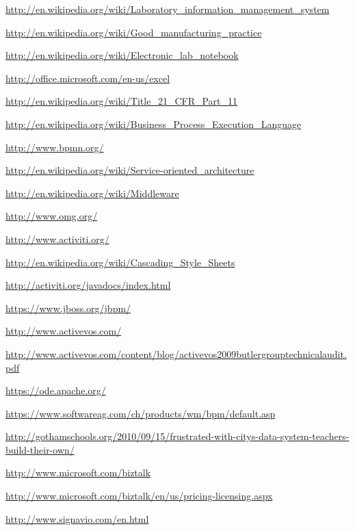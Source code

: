 \documentclass[paper=a4,twoside=false,BCOR=0mm,DIV=calc,fontsize=12pt]{scrartcl}
\begin{document}
\begin{thebibliography}{99}

 \url{http://en.wikipedia.org/wiki/Laboratory_information_management_system}

 \url{}

 \url{http://en.wikipedia.org/wiki/Good_manufacturing_practice}

 \url{http://en.wikipedia.org/wiki/Electronic_lab_notebook}

 \url{http://office.microsoft.com/en-us/excel}

 \url{http://en.wikipedia.org/wiki/Title_21_CFR_Part_11}

 \url{http://en.wikipedia.org/wiki/Business_Process_Execution_Language}

 \url{http://www.bpmn.org/}

 \url{http://en.wikipedia.org/wiki/Service-oriented_architecture}

 \url{http://en.wikipedia.org/wiki/Middleware}

 \url{http://www.omg.org/}

 \url{http://www.activiti.org/}

 \url{http://en.wikipedia.org/wiki/Cascading_Style_Sheets}

 \url{http://activiti.org/javadocs/index.html}

 \url{https://www.jboss.org/jbpm/}

 \url{http://www.activevos.com/}

 \url{http://www.activevos.com/content/blog/activevos2009butlergrouptechnicalaudit.pdf}

 \url{https://ode.apache.org/}

 \url{https://www.softwareag.com/ch/products/wm/bpm/default.asp}

 \url{http://gothamschools.org/2010/09/15/frustrated-with-citys-data-system-teachers-build-their-own/}

 \url{http://www.microsoft.com/biztalk}

 \url{http://www.microsoft.com/biztalk/en/us/pricing-licensing.aspx}

 \url{http://www.signavio.com/en.html}


\end{thebibliography}
\end{document}
